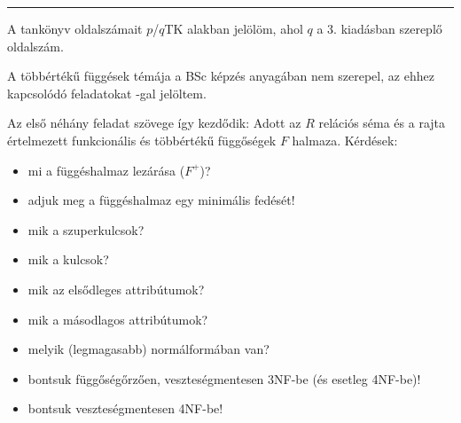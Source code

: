 \documentclass{article}
\begin{document}
\begingroup\makeatletter\lowercase{\endgroup
  \def\@listi{%
    \leftmargin=\leftmargini%
    \topsep=5pt plus3pt minus1pt%
    \parsep=0.5pt plus0.5pt minus0.5pt%
    \itemsep=3pt plus3pt minus1pt%
  }%
}


\smallskip
\hrule
\smallskip

A tankönyv oldalszámait $p$/$q$TK alakban jelölöm, ahol $q$ a 3. kiadásban szereplő oldalszám.

A többértékű függések témája a BSc képzés anyagában nem szerepel, az ehhez kapcsolódó feladatokat {\bf *}-gal jelöltem.

Az első néhány feladat szövege így kezdődik: Adott az $R$ relációs séma
és a rajta értelmezett funkcionális és többértékű függőségek $F$ halmaza. Kérdések:

\begin{itemize}

\item mi a függéshalmaz lezárása ($F^+$)?
\item adjuk meg a függéshalmaz egy minimális fedését!
\item mik a szuperkulcsok?
\item mik a kulcsok?
\item mik az elsődleges attribútumok?
\item mik a másodlagos attribútumok?
\item melyik (legmagasabb) normálformában van?
\item bontsuk függőségőrzően, veszteségmentesen 3NF-be (és esetleg 4NF-be)!
\item bontsuk veszteségmentesen 4NF-be!{\bf *}

\end{itemize}


\let\toot\twoheadrightarrow
\long{}
\newlength{\csillag}
\settowidth{\csillag}{{\bf *}}
\long{}
\long{}
\end{document}
